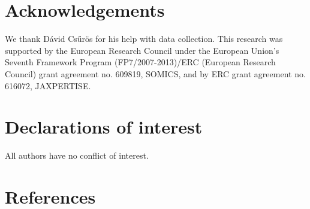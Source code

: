 \documentclass[
  english,
  man,floatsintext]{apa6}
\begin{document}
\hypertarget{acknowledgements}{%
\section{Acknowledgements}\label{acknowledgements}}

We thank Dávid Csűrös for his help with data collection. This research was supported by the European Research Council under the European Union's Seventh Framework Program (FP7/2007-2013)/ERC (European Research Council) grant agreement no. 609819, SOMICS, and by ERC grant agreement no. 616072, JAXPERTISE.

\hypertarget{declarations-of-interest}{%
\section{Declarations of interest}\label{declarations-of-interest}}

All authors have no conflict of interest.

\newpage

\hypertarget{references}{%
\section{References}\label{references}}

\begingroup
\setlength{\parindent}{-0in}
\setlength{\leftskip}{0in}
\end{document}
